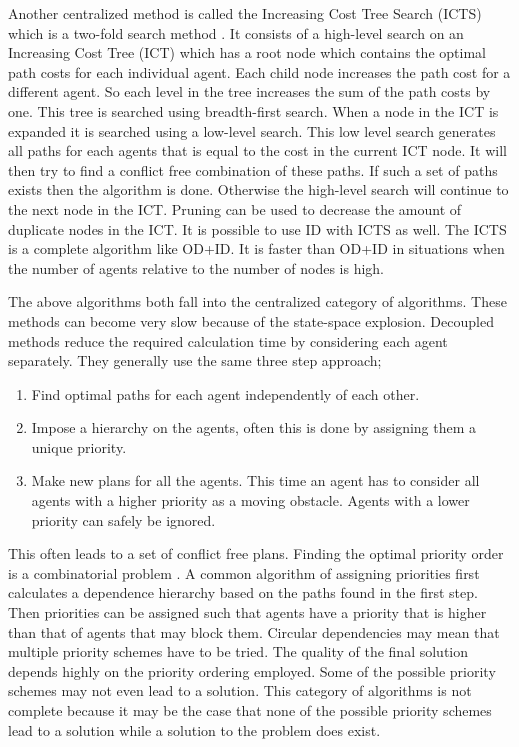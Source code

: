 Another centralized method is called the Increasing Cost Tree Search (ICTS)
which is a
two-fold search method \cite{sharon2013}. It consists of a high-level search on
an Increasing Cost Tree (ICT) which has a root node which contains the optimal
path costs for each individual agent. Each child node increases the path cost
for a different agent. So each level in the tree increases the sum of the path
costs by one. This tree is searched using breadth-first search. When a node in
the ICT is expanded it is searched using a low-level search. This low level
search
generates all paths for each agents that is equal to the cost in the current
ICT node. It will then try to find a conflict free combination of these paths.
If such a set of paths exists then the algorithm is done. Otherwise the
high-level search will continue to the next node in the ICT. Pruning can be
used to decrease the amount of duplicate nodes in the ICT. It is possible
to use ID with ICTS as well. The ICTS is a complete algorithm like OD+ID. It is
faster than OD+ID in situations when the number of agents relative to the
number of nodes is high.


The above algorithms both fall into the centralized category of algorithms.
These methods can become very slow because of the state-space explosion.
Decoupled methods reduce the required calculation time by considering each
agent separately. They generally use the same three step approach;
\begin{enumerate}
    \item Find optimal paths for each agent independently of each other.
    \item Impose a hierarchy on the agents, often this is done by assigning
    them a unique priority.
    \item Make new plans for all the agents. This time an agent has to consider
    all agents with a higher priority as a moving obstacle. Agents with a lower
    priority can safely be ignored.
\end{enumerate}
This often leads to a set of conflict free plans. Finding the optimal priority
order is a combinatorial problem \cite{bennewitz2002}. A common algorithm of
assigning priorities first calculates a dependence hierarchy based on the paths
found in the first step. Then priorities can be assigned such that agents have
a priority that is higher than that of agents that may block them. Circular
dependencies may mean that multiple priority schemes have to be tried. The
quality of the final solution depends highly on the priority ordering employed.
Some of the possible priority schemes may not even lead to a solution. This
category of algorithms is not complete because it may be the case that none of
the possible priority schemes lead to a solution while a solution to the
problem does exist.

